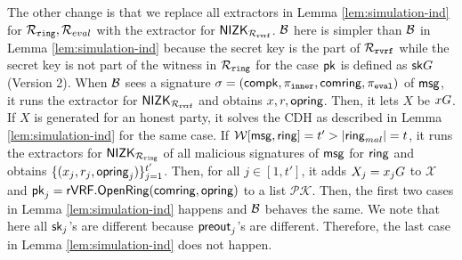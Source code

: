 The other change is that we replace all extractors in Lemma \ref{lem:simulation-ind} for $ \mathcal{R}_{\mathtt{ring}}, \mathcal{R}_{eval} $ with the extractor  for $ {\mathsf{NIZK}}_{\mathcal{R}_{\mathtt{rvrf}}} $. $ \mathcal{B} $ here is simpler than $ \mathcal{B}$ in Lemma \ref{lem:simulation-ind} because the secret key is the part of  $\mathcal{R}_{\mathtt{rvrf}}$ while the secret key is not part of the witness in $ \mathcal{R}_{\mathtt{ring}} $ for the case $ \mathsf{pk} $ is defined as $ \mathsf{sk}G $ (Version 2).
When $ \mathcal{B} $ sees a signature $ \sigma = (\mathsf{compk}, \pi_{\mathtt{inner}},\mathsf{comring}, \pi_{\mathtt{eval}})  $ of $ \mathsf{msg} $, it runs the extractor for $ {\mathsf{NIZK}}_{\mathcal{R}_{\mathtt{rvrf}}} $ and obtains $ x,r, \mathsf{opring} $. Then, it lets $ X $ be $ xG $. If $ X $ is generated for an honest party, it solves the CDH as described in Lemma \ref{lem:simulation-ind} for the same case. If $ \mathcal{W}[\mathsf{msg},\mathsf{ring}] = t' > |\mathsf{ring}_{mal}| = t$, it runs the extractors for $ {\mathsf{NIZK}}_{\mathcal{R}_{\mathtt{ring}}} $ of all malicious signatures of $ \mathsf{msg} $ for $ \mathsf{ring} $ and obtains $ \{(x_j,r_j,\mathsf{opring}_j)\}_{j = 1}^{t'}$. Then, for all $ j \in [1,t']$, it adds $ X_j = x_j G $ to $ \mathcal{X} $ and $ \mathsf{pk}_j  = {\mathsf{rVRF}}.{\mathsf{OpenRing}}(\mathsf{comring},\mathsf{opring})$ to a list $ \mathcal{PK} $. Then, the first two cases in Lemma \ref{lem:simulation-ind} happens and $ \mathcal{B} $ behaves the same.
We note that here all $ \mathsf{sk}_j $'s are different because $ {\mathsf{preout}}_j $'s are different. Therefore, the last case in Lemma  \ref{lem:simulation-ind} does not happen.



